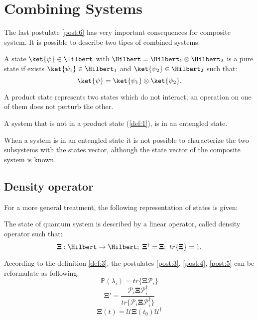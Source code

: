\section{Combining Systems}
The last postulate \ref{post:6} has very important consequences for composite system. It is possible
to describe two tipes of combined systems:

    \begin{definition}
        A state $\ket{\psi}\in\Hilbert$ with $\Hilbert=\Hilbert_1\otimes\Hilbert_2$ is a
        pure state if exists $\ket{\psi_1}\in\Hilbert_1$ and $\ket{\psi_2}\in\Hilbert_2$
        such that:
        \begin{equation*}
            \ket{\psi}=\ket{\psi_1}\otimes\ket{\psi_2}.
        \end{equation*}
        \label{def:1}
    \end{definition}
    A product state represents two states which do not interact; an operation on one of 
    them does not perturb the other.

    \begin{definition}
        A system that is not in a product state (\ref{def:1}), is in an entengled state. 
        \label{def:2}
    \end{definition}
    When a system is in an entengled state it is not possible to characterize the two subsystems
    with the states vector, although the state vector of the composite system is known.

    \subsection{Density operator}
        For a more general treatment, the following representation of states is given:
        \begin{definition}
            The state of quantum system is described by a linear operator, called density
            operator such that:
            \begin{equation*}
                \pmb{\Xi}:\Hilbert\to\Hilbert;\ \pmb{\Xi}^\dagger=\pmb{\Xi};\ tr\{\pmb{\Xi}\}=1.
            \end{equation*}
            \label{def:3}
        \end{definition}
        According to the definition \ref{def:3}, the postulates \ref{post:3}, \ref{post:4},
        \ref{post:5} can be reformulate as following.
        \begin{equation}
            \mathbb{P}(\lambda_i)=tr\{\pmb{\Xi}\mathcal{P}_i\}
            \label{post:3.1}
        \end{equation}
        \begin{equation}
            \pmb{\Xi}'=\frac{\mathcal{P}_i\pmb{\Xi}\mathcal{P}_i^\dagger}
            {tr\{\mathcal{P}_i\pmb{\Xi}\mathcal{P}_i^\dagger\}}
            \label{post:4.1}
        \end{equation}
        \begin{equation}
            \pmb{\Xi}(t)=\mathcal{U}\pmb{\Xi}(t_0)\mathcal{U}^\dagger
            \label{post:5.1}
        \end{equation}